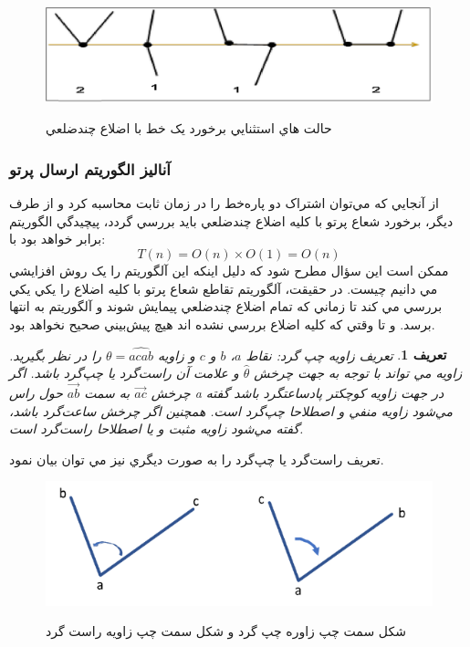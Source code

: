\documentclass{book}
\newtheorem{defn}[section]{تعریف}
\begin{document}
\begin{figure}[h!]
    \begin{center}
        \includegraphics{inter2.jpg}
        \label{inter2}
        \caption{حالت هاي استثنايي برخورد يک خط با اضلاع چندضلعي}
    \end{center}
\end{figure}

\subsubsection{آناليز الگوريتم ارسال پرتو}

از آنجايي که مي‌توان اشتراک دو پاره‌خط را در زمان ثابت محاسبه کرد و از طرف ديگر، برخورد شعاع پرتو با کليه اضلاع چندضلعي بايد بررسي گردد، پيچيدگي الگوريتم برابر خواهد بود با:
$$T(n)=O(n)\times O(1)=O(n)$$
ممکن است اين سؤال مطرح شود که دليل اينکه اين آلگوريتم را يک روش افزايشي مي دانيم چيست. در حقيقت، آلگوريتم تقاطع شعاع پرتو با کليه اضلاع را يکي يکي بررسي مي کند تا زماني که تمام اضلاع چند‌ضلعي پيمايش شوند و آلگوريتم به انتها برسد. و تا وقتي که کليه اضلاع بررسي نشده اند هيچ پيش‌بيني صحيح نخواهد بود.

\begin{defn}
    تعريف زاويه چپ گرد: نقاط $a$، $b$ و $c$ و زاويه $\theta=\hat{acab}$  را در نظر بگيريد. زاويه  مي تواند با توجه به جهت چرخش $\hat \theta$ و علامت آن راست‌گرد يا چپ‌گرد باشد. اگر چرخش $\vec{ac}$ به سمت $\vec{ab}$ حول راس a در جهت زاويه کوچکتر پادساعتگرد باشد گفته مي‌شود زاويه منفي و اصطلاحا چپ‌گرد است. همچنين اگر چرخش ساعت‌گرد باشد، گفته مي‌شود زاويه مثبت و يا اصطلاحا راست‌گرد است.
\end{defn}

تعريف راست‌گرد يا چپ‌گرد را به صورت ديگري نيز مي توان بيان نمود. 

\begin{figure}[h!]
    \begin{center}
        \includegraphics[width=\linewidth]{angel.png}
        \label{angel}
        \caption{شکل سمت چپ زاوره چپ ‌گرد و شکل سمت چپ‌ زاويه راست گرد}
    \end{center}
\end{figure}
\end{document}
